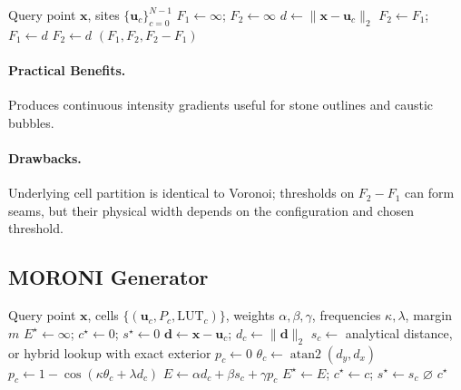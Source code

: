 \documentclass[sigconf,nonacm]{acmart}
\begin{document}
\begin{algorithm}[H]
\caption{Worley Cellular Basis ($F_1, F_2$)}
\begin{algorithmic}[1]
\Require Query point $\mathbf{x}$, sites $\{\mathbf{u}_c\}_{c=0}^{N-1}$
\State $F_1 \gets \infty$;\; $F_2 \gets \infty$
  \State $d \gets \lVert \mathbf{x} - \mathbf{u}_c \rVert_2$
    \State $F_2 \gets F_1$;\; $F_1 \gets d$
    \State $F_2 \gets d$
  \EndIf
\EndFor
\State \Return $(F_1, F_2, F_2 - F_1)$
\end{algorithmic}
\end{algorithm}

\paragraph{Practical Benefits.} Produces continuous intensity gradients useful
for stone outlines and caustic bubbles.
\paragraph{Drawbacks.} Underlying cell partition is identical to Voronoi;
thresholds on $F_2-F_1$ can form seams, but their physical width depends
on the configuration and chosen threshold.

\subsection{MORONI Generator}

\begin{algorithm}[H]
\caption{Full MORONI Generator with Grout Release}
\begin{algorithmic}[1]
\Require Query point $\mathbf{x}$, cells $\{(\mathbf{u}_c, P_c, \mathrm{LUT}_c)\}$,
weights $\alpha, \beta, \gamma$, frequencies $\kappa,\lambda$, margin $m$
\State $E^\star \gets \infty$;\; $c^\star \gets 0$;\; $s^\star \gets 0$
  \State $\mathbf{d} \gets \mathbf{x} - \mathbf{u}_c$;\; $d_c \gets \lVert\mathbf{d}\rVert_2$
  \State $s_c\gets$ analytical distance, or hybrid lookup with exact exterior
  \State $p_c\gets 0$
    \State $\theta_c\gets\operatorname{atan2}(d_y,d_x)$
    \State $p_c\gets1-\cos(\kappa\theta_c+\lambda d_c)$
  \EndIf
  \State $E \gets \alpha d_c + \beta s_c + \gamma p_c$
    \State $E^\star \gets E$;\; $c^\star \gets c$;\; $s^\star \gets s_c$
  \EndIf
\EndFor
{}
  \State \Return $\varnothing$ 
\Else
  \State \Return $c^\star$
\EndIf
\end{algorithmic}
\end{algorithm}
\end{document}
